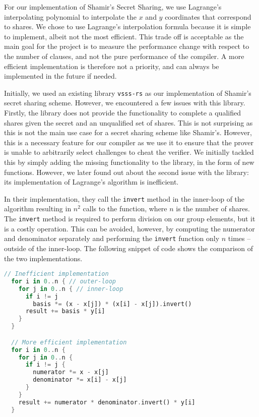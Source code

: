 For our implementation of Shamir's Secret Sharing, we use Lagrange's interpolating 
polynomial to interpolate the $x$ and $y$ coordinates that correspond to shares. We 
chose to use Lagrange's interpolation formula because it is simple to implement, 
albeit not the most efficient. This trade off is acceptable as the main goal for the project 
is to measure the performance change with respect to the number of clauses, and 
not the pure performance of the compiler. A more efficient implementation is therefore 
not a priority, and can always be implemented in the future if needed. 

Initially, we used an existing library \texttt{vsss-rs} \cite{vsss-rs} as our implementation of 
Shamir's secret sharing scheme. However, we encountered a few issues with this library. Firstly, 
the library does not provide the functionality to complete a qualified shares given the secret 
and an unqualified set of shares. This is not surprising as this is not the main use case for 
a secret sharing scheme like Shamir's. However, this is a necessary feature for our compiler
as we use it to ensure that the prover is unable to arbitrarily select challenges to cheat the 
verifier. We initially tackled this by simply adding the missing functionality to the library, 
in the form of new functions. However, we later found out about the second issue with the library:
its implementation of Lagrange's algorithm is inefficient.

In their implementation, they call the \texttt{invert} 
method in the inner-loop of the algorithm resulting in $n^2$ calls to the function, 
where $n$ is the number of shares. The \texttt{invert} method is required to perform 
division on our group elements, but it is a costly operation. 
This can be avoided, however, by computing the numerator and denominator 
separately and performing the \texttt{invert} function only $n$ times -- outside of the inner-loop. 
The following snippet of code shows the comparison of the two implementations. 

\begin{lstlisting}[language=rust]
  // Inefficient implementation
  for i in 0..n { // outer-loop
    for j in 0..n { // inner-loop
      if i != j
        basis *= (x - x[j]) * (x[i] - x[j]).invert()
      result += basis * y[i]
    }
  }

  // More efficient implementation
  for i in 0..n {
    for j in 0..n {
      if i != j {
        numerator *= x - x[j]
        denominator *= x[i] - x[j]
      }
    }
    result += numerator * denominator.invert() * y[i]
  }
\end{lstlisting}

